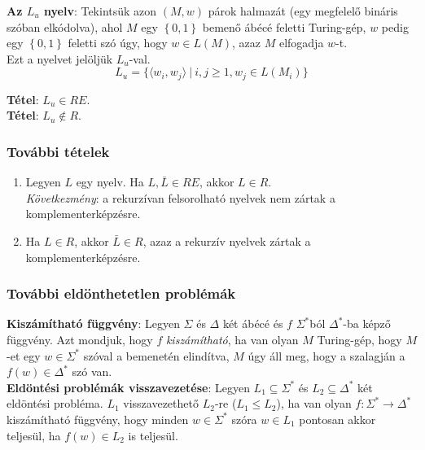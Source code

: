 \documentclass[tikz,12pt,margin=0px]{article}
\begin{document}
    \noindent \textbf{Az $L_{u}$ nyelv}: Tekintsük azon $(M, w)$ párok halmazát (egy megfelelő bináris szóban elkódolva), ahol $M$ egy $\left\{0, 1\right\}$	bemenő ábécé feletti Turing-gép, $w$ pedig egy $\left\{0, 1\right\}$ feletti szó úgy, hogy $w \in L(M)$, azaz $M$ elfogadja $w$-t.\\

    \noindent Ezt a nyelvet jelöljük $L_{u}$-val.
    \[
        L_{u} = \Big\{\langle w_{i},w_{j} \rangle \ \Big| \ i, j \geq 1, w_{j} \in L(M_{i}) \Big\}
    \]
	
	\noindent \textbf{Tétel}: $L_{u} \in RE$.\\
	
	\noindent \textbf{Tétel}: $L_{u} \notin R$.
	
	\subsubsection*{További tételek}
	
	\begin{enumerate}
		\item Legyen $L$ egy nyelv. Ha $L, \bar{L} \in RE$, akkor $L \in R$. \\
        \emph{Következmény}: a rekurzívan felsorolható nyelvek nem zártak a komplementerképzésre.
		\item	Ha $L \in R$, akkor $\bar{L} \in R$, azaz a rekurzív nyelvek zártak a komplementerképzésre.
	\end{enumerate}
	
	\subsubsection*{További eldönthetetlen problémák}
	
    \noindent \textbf{Kiszámítható függvény}: Legyen $\Sigma$ és $\Delta$ két ábécé és $f$ $\Sigma^{*}$ból $\Delta^{*}$-ba képző függvény. Azt mondjuk, hogy $f$ \emph{kiszámítható}, ha van olyan $M$ Turing-gép, hogy $M$-et egy $w \in \Sigma^{*}$ szóval a bemenetén elindítva, $M$ úgy áll meg, hogy a szalagján a $f(w) \in \Delta^{*}$ szó van.\\
	
    \noindent \textbf{Eldöntési problémák visszavezetése}: Legyen $L_{1} \subseteq \Sigma^{*}$ és $L_{2} \subseteq \Delta^{*}$ két eldöntési probléma. $L_{1}$ visszavezethető $L_{2}$-re ($L_{1} \leq L_{2}$), ha van olyan $f : \Sigma^{*} \to \Delta^{*}$ kiszámítható függvény, hogy minden $w \in \Sigma^{*}$ szóra $w \in L_{1}$ pontosan akkor teljesül, ha $f(w) \in L_{2}$ is teljesül.\\
	
\end{document}

